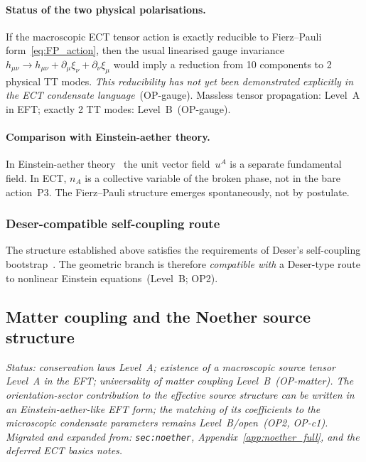 \paragraph{Status of the two physical polarisations.}
If the macroscopic ECT tensor action is exactly reducible to
Fierz--Pauli form~\eqref{eq:FP_action}, then the usual linearised
gauge invariance
$h_{\mu\nu}\to h_{\mu\nu}+\partial_\mu\xi_\nu+\partial_\nu\xi_\mu$
would imply a reduction from 10 components to 2 physical TT modes.
\emph{This reducibility has not yet been demonstrated explicitly
in the ECT condensate language}~(OP-gauge).
Massless tensor propagation: Level~A in EFT;
exactly 2 TT modes: Level~B~(OP-gauge).

\paragraph{Comparison with Einstein-aether theory.}
In Einstein-aether theory~\cite{Jacobson2004} the unit vector
field~$u^A$ is a separate fundamental field.
In ECT, $n_A$ is a collective variable of the broken phase, not
in the bare action~P3.
The Fierz--Pauli structure emerges spontaneously, not by postulate.

\subsubsection*{Deser-compatible self-coupling route}

The structure established above satisfies the requirements of
Deser's self-coupling bootstrap~\cite{Deser1970}.
The geometric branch is therefore \emph{compatible with} a
Deser-type route to nonlinear Einstein equations~(Level~B; OP2).


\subsection{Matter coupling and the Noether source structure}
\label{sec:mp_noether}

\textit{Status: conservation laws Level~A; existence of a macroscopic
source tensor Level~A in the EFT; universality of matter coupling
Level~B~(OP-matter). The orientation-sector contribution to the
effective source structure can be written in an Einstein-aether-like
EFT form; the matching of its coefficients to the microscopic
condensate parameters remains Level~B/open~(OP2, OP-c1).
Migrated and expanded from: \texttt{sec:noether},
Appendix~\ref{app:noether_full}, and the deferred ECT basics notes.}

